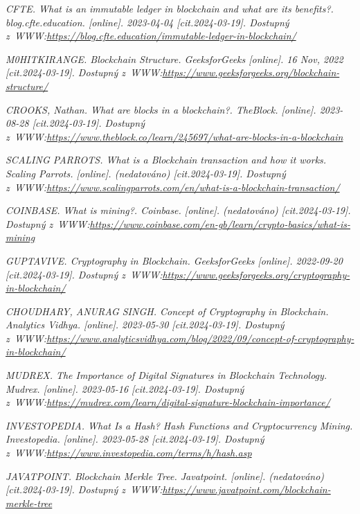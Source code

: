 \documentclass[a4paper,12pt]{article}
\begin{document}
{	\it{CFTE. What is an immutable ledger in blockchain and what are its benefits?. blog.cfte.education. [online]. 2023-04-04 } [cit.2024-03-19]. Dostupný z~WWW:\url{https://blog.cfte.education/immutable-ledger-in-blockchain/}
	
	\it{M0HITKIRANGE. Blockchain Structure. GeeksforGeeks [online]. 16 Nov, 2022} [cit.2024-03-19]. Dostupný z~WWW:\url{https://www.geeksforgeeks.org/blockchain-structure/}
	
	
	\it{CROOKS, Nathan. What are blocks in a blockchain?. TheBlock. [online]. 2023-08-28} [cit.2024-03-19]. Dostupný z~WWW:\url{https://www.theblock.co/learn/245697/what-are-blocks-in-a-blockchain}
	
	\it{SCALING PARROTS. What is a Blockchain transaction and how it works. Scaling Parrots. [online]. (nedatováno)} [cit.2024-03-19]. Dostupný z~WWW:\url{https://www.scalingparrots.com/en/what-is-a-blockchain-transaction/
	}
	
	\it{COINBASE. What is mining?. Coinbase. [online]. (nedatováno) }[cit.2024-03-19]. Dostupný z~WWW:\url{https://www.coinbase.com/en-gb/learn/crypto-basics/what-is-mining}

	\it{GUPTAVIVE. Cryptography in Blockchain. GeeksforGeeks [online]. 2022-09-20 }[cit.2024-03-19]. Dostupný z~WWW:\url{https://www.geeksforgeeks.org/cryptography-in-blockchain/}
	
	\it{CHOUDHARY, ANURAG SINGH. Concept of Cryptography in Blockchain. Analytics Vidhya. [online]. 2023-05-30 }[cit.2024-03-19]. Dostupný z~WWW:\url{https://www.analyticsvidhya.com/blog/2022/09/concept-of-cryptography-in-blockchain/}
	
	
	\it{MUDREX. The Importance of Digital Signatures in Blockchain Technology. Mudrex.  [online]. 2023-05-16 }[cit.2024-03-19]. Dostupný z~WWW:\url{https://mudrex.com/learn/digital-signature-blockchain-importance/}
	
	
	\it{INVESTOPEDIA. What Is a Hash? Hash Functions and Cryptocurrency Mining. Investopedia. [online]. 2023-05-28 } [cit.2024-03-19]. Dostupný z~WWW:\url{https://www.investopedia.com/terms/h/hash.asp}
	
	
	\it{JAVATPOINT. Blockchain Merkle Tree. Javatpoint. [online]. (nedatováno) }[cit.2024-03-19]. Dostupný z~WWW:\url{https://www.javatpoint.com/blockchain-merkle-tree}
	
}
\end{document}
